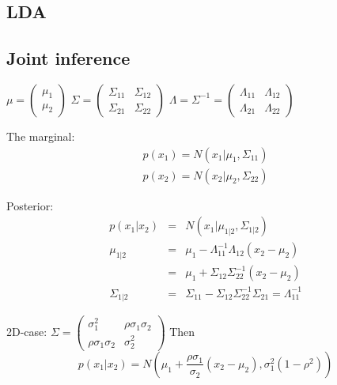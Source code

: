 \documentclass{article}
\begin{document}
\subsection{LDA}

\subsection{Joint inference}
$\mu=\begin{pmatrix} \mu_1 \\ \mu_2 \end{pmatrix} $
$\Sigma=\begin{pmatrix} \Sigma_{11} & \Sigma_{12}  \\ \Sigma_{21}  & \Sigma_{22}  \end{pmatrix} $
$\Lambda=\Sigma^{-1}=\begin{pmatrix} \Lambda_{11} & \Lambda_{12}  \\ \Lambda_{21}  & \Lambda_{22}  \end{pmatrix} $

The marginal:
\begin{eqnarray}
p(x_1) = N(x_1|\mu_1,\Sigma_{11})\\
p(x_2) = N(x_2|\mu_2,\Sigma_{22})
\end{eqnarray}

Posterior:
\begin{eqnarray}
p(x_1|x_2) &=& N(x_1|\mu_{1|2},\Sigma_{1|2})\\
\mu_{1|2} &=& \mu_1 - \Lambda_{11}^{-1}\Lambda_{12}(x_2-\mu_2)\\
        &=& \mu_1 + \Sigma_{12}\Sigma_{22}^{-1}(x_2-\mu_2)\\
\Sigma_{1|2} &=& \Sigma_{11}-\Sigma_{12}\Sigma_{22}^{-1}\Sigma_{21}=\Lambda_{11}^{-1}
\end{eqnarray}

2D-case:
$\Sigma=\begin{pmatrix} \sigma_1^2 & \rho\sigma_1\sigma_2  \\ \rho\sigma_1\sigma_2  & \sigma_2^2  \end{pmatrix} $
Then
\begin{equation}
p(x_1|x_2)=N(\mu_1+\frac{\rho\sigma_1}{\sigma_2}(x_2-\mu_2),\sigma_1^2(1-\rho^2))
\end{equation}
\end{document}
